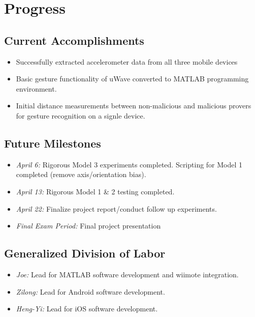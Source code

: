 
\section{Progress}
\label{sec:Progress}

\subsection{Current Accomplishments}

\begin{itemize}
\item Successfully extracted accelerometer data from all three mobile devices
\item Basic gesture functionality of uWave converted to MATLAB programming environment.
\item Initial distance measurements between non-malicious and malicious provers for gesture recognition on a signle device.
\end{itemize}

\subsection{Future Milestones}

\begin{itemize}
\item \emph{April 6:} Rigorous Model 3 experiments completed. Scripting for Model 1 completed (remove axis/orientation bias).
\item \emph{April 13:} Rigorous Model 1 \& 2 testing completed. 
\item \emph{April 22:} Finalize project report/conduct follow up experiments. 
\item \emph{Final Exam Period:} Final project presentation
\end{itemize}

\subsection{Generalized Division of Labor}

\begin{itemize}
\item \emph{Joe:} Lead for MATLAB software development and wiimote integration.
\item \emph{Zilong:} Lead for Android software development. 
\item \emph{Heng-Yi:} Lead for iOS software development. 
\end{itemize}

